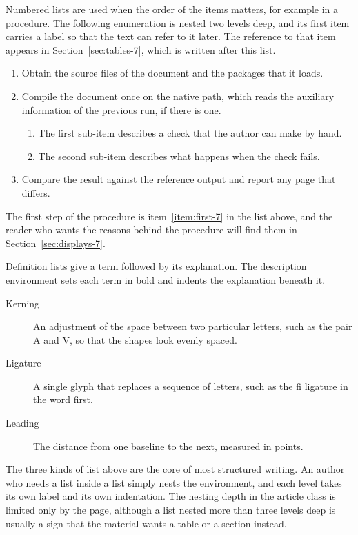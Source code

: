 \documentclass{article}
\begin{document}
Numbered lists are used when the order of the items matters, for example in a
procedure. The following enumeration is nested two levels deep, and its first item
carries a label so that the text can refer to it later. The reference to that item
appears in Section~\ref{sec:tables-7}, which is written after this list.

\begin{enumerate}
  \item\label{item:first-7} Obtain the source files of the document and the packages that
        it loads.
  \item Compile the document once on the native path, which reads the auxiliary
        information of the previous run, if there is one.
        \begin{enumerate}
          \item The first sub-item describes a check that the author can make by hand.
          \item The second sub-item describes what happens when the check fails.
        \end{enumerate}
  \item Compare the result against the reference output and report any page that
        differs.
\end{enumerate}

The first step of the procedure is item~\ref{item:first-7} in the list above, and the
reader who wants the reasons behind the procedure will find them in
Section~\ref{sec:displays-7}.

Definition lists give a term followed by its explanation. The description environment
sets each term in bold and indents the explanation beneath it.

\begin{description}
  \item[Kerning] An adjustment of the space between two particular letters, such as
        the pair A and V, so that the shapes look evenly spaced.
  \item[Ligature] A single glyph that replaces a sequence of letters, such as the
        fi ligature in the word first.
  \item[Leading] The distance from one baseline to the next, measured in points.
\end{description}

The three kinds of list above are the core of most structured writing. An author who
needs a list inside a list simply nests the environment, and each level takes its own
label and its own indentation. The nesting depth in the article class is limited only
by the page, although a list nested more than three levels deep is usually a sign that
the material wants a table or a section instead.
\end{document}
